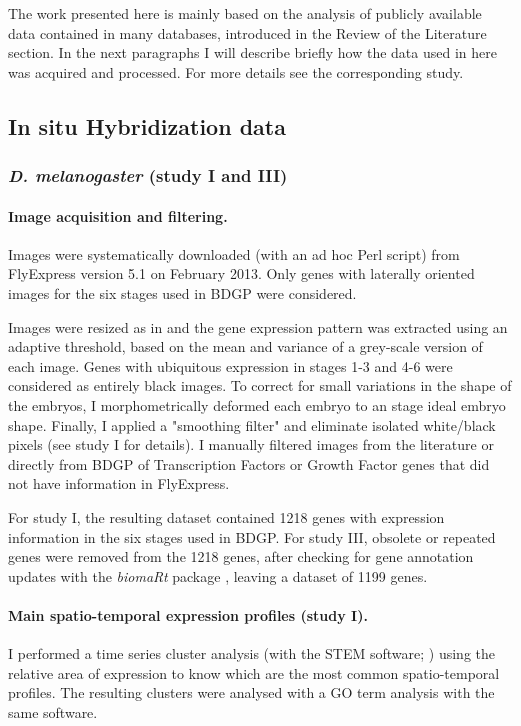 The work presented here is mainly based on the analysis of publicly available data contained in many databases, introduced in the Review of the Literature section. In the next paragraphs I will describe briefly how the data used in here was acquired and processed. For more details see the corresponding study.

\subsection{In situ Hybridization data}

\subsubsection{\textit{D. melanogaster} (study I and III)}
\label{insitu_drosophila}
\paragraph{Image acquisition and filtering.}

Images were systematically downloaded (with an ad hoc Perl script) from FlyExpress version 5.1 \citep{Kumar2011} on February 2013. Only genes with laterally oriented images for the six stages used in BDGP \citep{Tomancak2002} were considered.

Images were resized as in \citet{Konikoff2012} and the gene expression pattern was extracted using an adaptive threshold, based on the mean and variance of a grey-scale version of each image. Genes with ubiquitous expression in stages 1-3 and 4-6 were considered as entirely black images.
To correct for small variations in the shape of the embryos, I morphometrically deformed each embryo to an stage ideal embryo shape. Finally, I applied a "smoothing filter" and eliminate isolated white/black pixels (see study I for details). 
I manually filtered images from the literature or directly from BDGP of Transcription Factors or Growth Factor genes that did not have information in FlyExpress.
 
For study I, the resulting dataset contained 1218 genes with expression information in the six stages used in BDGP. For study III, obsolete or repeated genes were removed from the 1218 genes, after checking for gene annotation updates with the \textit{biomaRt} package \citep{Durinck2009}, leaving a dataset of 1199 genes.

\paragraph{Main spatio-temporal expression profiles (study I).}
I performed a time series cluster analysis (with the STEM software; \citealp{Ernst2006}) using the relative area of expression to know which are the most common spatio-temporal profiles. The resulting clusters were analysed with a GO term analysis with the same software.

